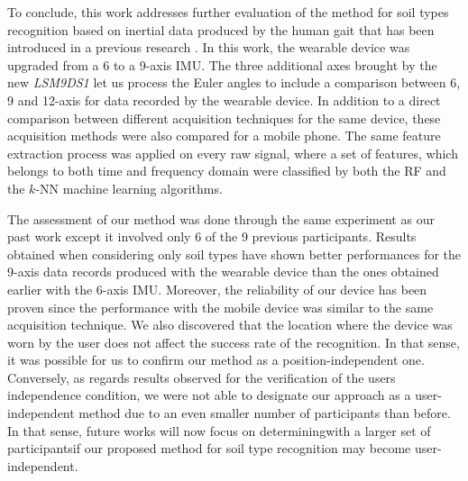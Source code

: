 \documentclass[10pt,conference]{IEEEtran}
\begin{document}
To conclude, this work addresses further evaluation of the method for soil types recognition based on inertial data produced by the human gait that has been introduced in a previous research \cite{Thullier2017b}. In this work, the wearable device was upgraded from a 6 to a 9-axis IMU. The three additional axes brought by the new \textit{LSM9DS1} let us process the Euler angles to include a comparison between 6, 9 and 12-axis for data recorded by the wearable device. In addition to a direct comparison between different acquisition techniques for the same device, these acquisition methods were also compared for a mobile phone. The same feature extraction process was applied on every raw signal, where a set of features, which belongs to both time and frequency domain were classified by both the RF and the $k$-NN machine learning algorithms.

The assessment of our method was done through the same experiment as our past work except it involved only 6 of the 9 previous participants. Results obtained when considering only soil types have shown better performances for the 9-axis data records produced with the wearable device than the ones obtained earlier with the 6-axis IMU. Moreover, the reliability of our device has been proven since the performance with the mobile device was similar to the same acquisition technique. We also discovered that the location where the device was worn by the user does not affect the success rate of the recognition. In that sense, it was possible for us to confirm our method as a position-independent one. Conversely, as regards results observed for the verification of the user\textquotesingle s independence condition, we were not able to designate our approach as a user-independent method due to an even smaller number of participants than before. In that sense, future works will now focus on determining\textemdash with a larger set of participants\textemdash if our proposed method for soil type recognition may become user-independent.

\end{document}
